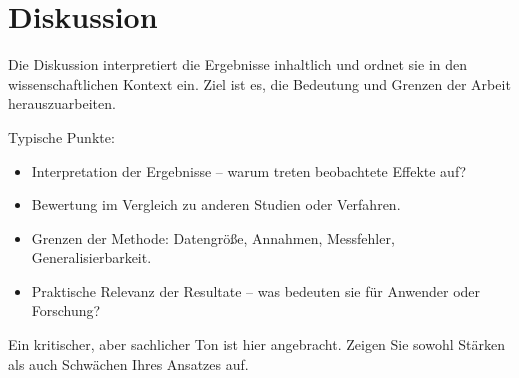 \chapter{Diskussion}\label{ch:diskussion}

Die Diskussion interpretiert die Ergebnisse inhaltlich und ordnet sie in den wissenschaftlichen Kontext ein.
Ziel ist es, die Bedeutung und Grenzen der Arbeit herauszuarbeiten.

Typische Punkte:
\begin{itemize}
\item Interpretation der Ergebnisse – warum treten beobachtete Effekte auf?
\item Bewertung im Vergleich zu anderen Studien oder Verfahren.
\item Grenzen der Methode: Datengröße, Annahmen, Messfehler, Generalisierbarkeit.
\item Praktische Relevanz der Resultate – was bedeuten sie für Anwender oder Forschung?
\end{itemize}

Ein kritischer, aber sachlicher Ton ist hier angebracht. Zeigen Sie sowohl Stärken als auch Schwächen Ihres Ansatzes auf.



